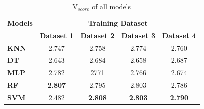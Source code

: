 \begin{table}[H]
  \centering
  \caption{V$_{score}$ of all models}
  \label{tab:v_score_of_models}
  \begin{tabular}{|l|c|c|c|c|}
    \hline
    \textbf{Models} & \multicolumn{4}{c|}{\bfseries Training Dataset}                                                                \\
    \cline{2-5}
                    & \textbf{Dataset 1}                              & \textbf{Dataset 2} & \textbf{Dataset 3} & \textbf{Dataset 4} \\
    \hline
    \textbf{KNN}    & 2.747                                           & 2.758              & 2.774              & 2.760              \\
    \textbf{DT}     & 2.643                                           & 2.684              & 2.658              & 2.687              \\
    \textbf{MLP}    & 2.782                                           & 2771               & 2.766              & 2.674              \\
    \textbf{RF}     & \textbf{2.807}                                  & 2.795              & 2.803              & 2.786              \\
    \textbf{SVM}    & 2.482                                           & \textbf{2.808}     & \textbf{2.803}     & \textbf{2.790}     \\
    \hline
  \end{tabular}
\end{table}

